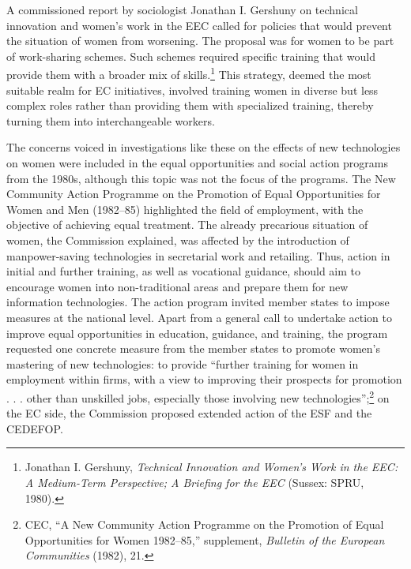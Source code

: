 \documentclass{tufte-handout}
\begin{document}
A commissioned report by sociologist Jonathan I. Gershuny on technical
innovation and women's work in the EEC called for policies that would
prevent the situation of women from worsening. The proposal was for
women to be part of work-sharing schemes. Such schemes required specific
training that would provide them with a broader mix of
skills.\footnote{Jonathan I. Gershuny, \emph{Technical Innovation and
  Women's Work in the EEC: A Medium-Term Perspective; A Briefing for the
  EEC} (Sussex: SPRU, 1980).} This strategy, deemed the most suitable
realm for EC initiatives, involved training women in diverse but less
complex roles rather than providing them with specialized training,
thereby turning them into interchangeable workers.

The concerns voiced in investigations like these on the effects of new
technologies on women were included in the equal opportunities and
social action programs from the 1980s, although this topic was not the
focus of the programs. The New Community Action Programme on the
Promotion of Equal Opportunities for Women and Men (1982--85)
highlighted the field of employment, with the objective of achieving
equal treatment. The already precarious situation of women, the
Commission explained, was affected by the introduction of
manpower-saving technologies in secretarial work and retailing. Thus,
action in initial and further training, as well as vocational guidance,
should aim to encourage women into non-traditional areas and prepare
them for new information technologies. The action program invited member
states to impose measures at the national level. Apart from a general
call to undertake action to improve equal opportunities in education,
guidance, and training, the program requested one concrete measure from
the member states to promote women's mastering of new technologies: to
provide ``further training for women in employment within firms, with a
view to improving their prospects for promotion . . . other than
unskilled jobs, especially those involving new
technologies'';\footnote{CEC, ``A New Community Action Programme on the
  Promotion of Equal Opportunities for Women 1982--85,'' supplement,
  \emph{Bulletin of the European Communities} (1982), 21.} on the EC
side, the Commission proposed extended action of the ESF and the
CEDEFOP.
\end{document}

